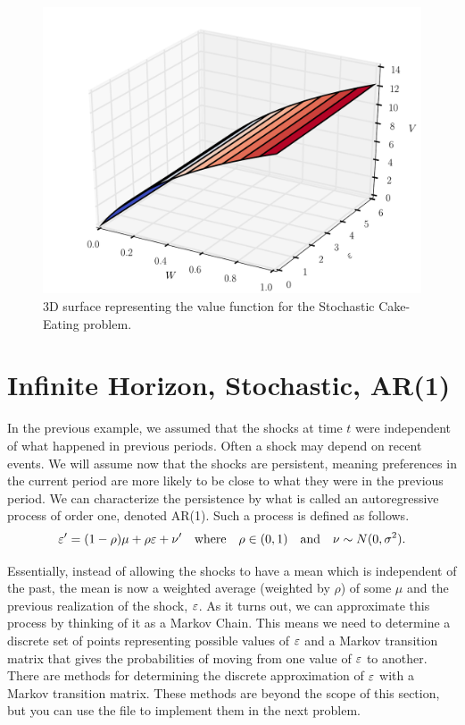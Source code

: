 \begin{figure}
    \centering
    \includegraphics[width = \textwidth]{stoch_value.pdf}
    \caption{3D surface representing the value function for the Stochastic Cake-Eating problem.}
\end{figure}

\section*{Infinite Horizon, Stochastic, AR(1)}\label{SecRecProbInfinHorStochAR1}

In the previous example, we assumed that the shocks at time $t$ were independent of what happened in
previous periods.  Often a shock may depend on recent events.  We will assume now that the shocks are persistent,
meaning preferences in the current period are more likely to be close to what they were in the previous period.
We can characterize the persistence by what is called an autoregressive process of order one, denoted AR(1).
Such a process is defined as follows.
\begin{equation}\label{EqAR1shock}
\varepsilon' = (1-\rho)\mu + \rho\varepsilon + \nu' \quad\text{where}\quad \rho\in(0,1) \quad\text{and}\quad \nu\sim N(0,\sigma^2).
\end{equation}

Essentially, instead of allowing the shocks to have a mean which is independent of the past, the mean is now a
weighted average (weighted by $\rho$) of some $\mu$ and the previous realization of the shock, $\varepsilon$.  As it turns
 out, we can approximate this process by thinking of it as a Markov Chain. This means we need to determine a
 discrete set of points representing possible values of $\varepsilon$ and a Markov transition matrix that gives the
 probabilities of moving from one value of $\varepsilon$ to another.  There are methods for determining the discrete
 approximation of $\varepsilon$ with a Markov transition matrix.  These methods are beyond the scope of this section,
 but you can use the file  to implement them in the next problem.

